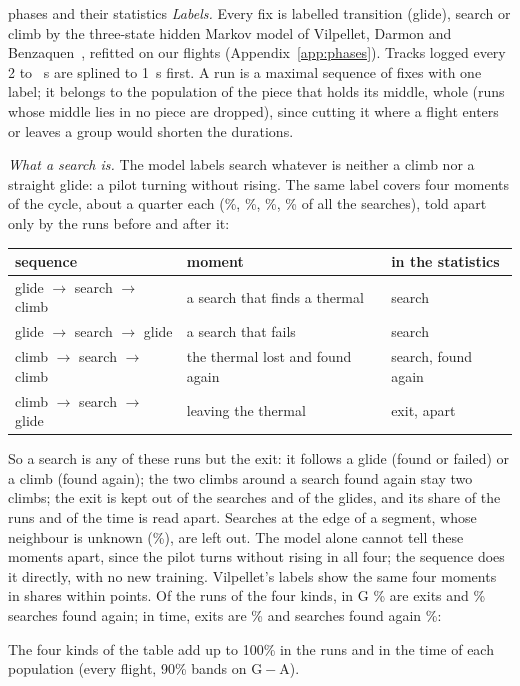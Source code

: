 \documentclass[10pt,a4paper]{article}
\newcommand{\G}{\mathrm{G}}
\newcommand{\A}{\mathrm{A}}
\begin{document}
\begin{method}{phases and their statistics}
  \emph{Labels.} Every fix is labelled transition (glide), search or climb by the three-state hidden Markov
  model of Vilpellet, Darmon and Benzaquen~\cite{vilpellet2026}, refitted on our flights
  (Appendix~\ref{app:phases}). Tracks logged every 2 to \DtMax~s are splined to 1~s first. A run is a maximal
  sequence of fixes with one label; it belongs to the population of the piece that holds its middle, whole
  (runs whose middle lies in no piece are dropped), since cutting it where a flight enters or leaves a group would shorten the durations.

  \emph{What a search is.} The model labels search whatever is neither a climb nor a straight glide: a pilot
  turning without rising. The same label covers four moments of the cycle, about a quarter each
  (\PhCtxFound\%, \PhCtxFailed\%, \PhCtxRefound\%, \PhCtxExit\% of all the searches), told apart only by the runs
  before and after it:
  \begin{center}\footnotesize
  \begin{tabular}{@{}l l l@{}}
  \toprule
  sequence & moment & in the statistics \\
  \midrule
  glide $\to$ search $\to$ climb & a search that finds a thermal & search \\
  glide $\to$ search $\to$ glide & a search that fails & search \\
  climb $\to$ search $\to$ climb & the thermal lost and found again & search, found again \\
  climb $\to$ search $\to$ glide & leaving the thermal & exit, apart \\
  \bottomrule
  \end{tabular}
  \end{center}
  So a search is any of these runs but the exit: it follows a glide (found or failed) or a climb (found again); the
  two climbs around a search found again stay two climbs; the exit is kept out of the searches and of the glides,
  and its share of the runs and of the time is read apart. Searches at the edge of a segment, whose
  neighbour is unknown (\PhSearchDropped\%), are left out. The model alone cannot tell these moments apart,
  since the pilot turns without rising in all four; the sequence does it directly, with no new training. Vilpellet's
  labels show the same four moments in shares within \PhCtxMaxDiff{} points. Of the runs of the four kinds,
  in $\G$ \PhKindExitRunsGAll\% are exits and \PhKindRefoundRunsGAll\% searches found again; in time, exits are
  \PhKindExitTimeGAll\% and searches found again \PhKindRefoundTimeGAll\%:
  \begin{center}\footnotesize
  
  \end{center}
  The four kinds of the table add up to 100\% in the runs and in the time of each population (every flight, 90\% bands on $\G-\A$).


\end{method}
\end{document}
